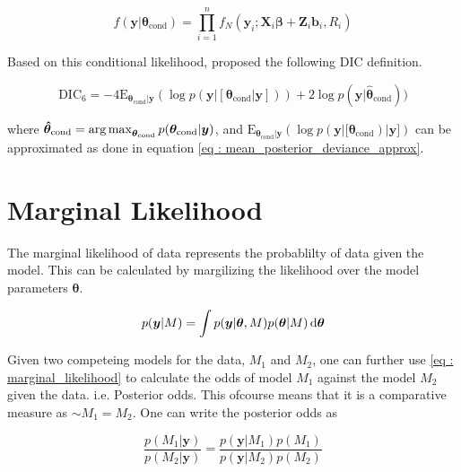 \begin{equation}
\label{eq : conditional_data_likelihood}
f(\boldsymbol{y}|\boldsymbol{\theta}_\text{cond}) = \prod_{i=1}^n f_N(\boldsymbol{y}_i; \boldsymbol{X}_i\boldsymbol{\beta} + \boldsymbol{Z}_i \boldsymbol{b}_i, R_i)
\end{equation}

Based on this conditional likelihood, \citet{celeux_deviance_2006} proposed the following DIC definition.

\begin{equation}
\label{eq : DIC6}
\text{DIC}_6 = -4\text{E}_{\boldsymbol{\theta}_\text{cond}|\boldsymbol{y}} (\log{p(\boldsymbol{y}|[\boldsymbol{\theta}_{\text{cond}}|\boldsymbol{y}])}) + 2\log{p(\boldsymbol{y}|\boldsymbol{\hat{\theta}}_\text{cond})})
\end{equation}

where
$\boldsymbol{\hat{\theta}}_\text{cond} = \operatorname*{arg\,max}_{\boldsymbol{\theta}_\text{cond}}p(\boldsymbol{\theta}_\text{cond}|\boldsymbol{y})$, and $\text{E}_{\boldsymbol{\theta}_\text{cond}|\boldsymbol{y}} (\log{p(\boldsymbol{y}|[\boldsymbol{\theta}_{\text{cond}})}|\boldsymbol{y}])$ can be approximated as done in equation \ref{eq : mean_posterior_deviance_approx}.

\section{Marginal Likelihood}
\label{sec : marginal_likelihood}

The marginal likelihood of data represents the probablilty of data given the model. This can be calculated by margilizing the likelihood over the model parameters $\boldsymbol{\theta}$. 

\begin{equation}
\label{eq : marginal_likelihood}
p(\boldsymbol{y}|M) = \int p(\boldsymbol{y}|\boldsymbol{\theta}, M) p(\boldsymbol{\theta}|M) \mathop{}\!\mathrm{d} \boldsymbol{\theta}
\end{equation}

Given two competeing models for the data, $M_1$ and $M_2$, one can further use \ref{eq : marginal_likelihood} to calculate the odds of model $M_1$ against the model $M_2$ given the data. i.e. Posterior odds. This ofcourse means that it is a comparative measure as $\sim M_1 = M_2$. One can write the posterior odds as

$$\frac {p(M_1|\boldsymbol{y})}{p(M_2|\boldsymbol{y})} = \frac {p(\boldsymbol{y}|M_1) p(M_1)} {p(\boldsymbol{y}|M_2) p(M_2)}$$

